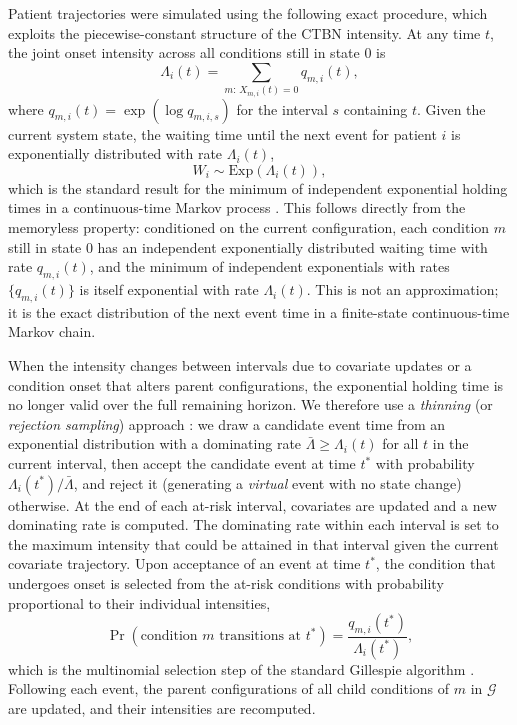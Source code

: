\documentclass[12pt]{article}
\begin{document}
Patient trajectories were simulated using the following exact procedure, which exploits the piecewise-constant structure of the CTBN intensity. At any time $t$, the joint onset intensity across all conditions still in state 0 is
\[
\Lambda_i(t) = \sum_{m:\, X_{m,i}(t) = 0} q_{m,i}(t),
\]
where $q_{m,i}(t) = \exp(\log q_{m,i,s})$ for the interval $s$ containing $t$. Given the current system state, the waiting time until the next event for patient $i$ is exponentially distributed with rate $\Lambda_i(t)$,
\[
W_i \sim \mathrm{Exp}(\Lambda_i(t)),
\]
which is the standard result for the minimum of independent exponential holding times in a continuous-time Markov process \citep{Norris1997}. This follows directly from the memoryless property: conditioned on the current configuration, each condition $m$ still in state 0 has an independent exponentially distributed waiting time with rate $q_{m,i}(t)$, and the minimum of independent exponentials with rates $\{q_{m,i}(t)\}$ is itself exponential with rate $\Lambda_i(t)$. This is not an approximation; it is the exact distribution of the next event time in a finite-state continuous-time Markov chain.

When the intensity changes between intervals due to covariate updates or a condition onset that alters parent configurations, the exponential holding time is no longer valid over the full remaining horizon. We therefore use a \emph{thinning} (or \emph{rejection sampling}) approach \citep{Lewis1979, Ogata1981}: we draw a candidate event time from an exponential distribution with a dominating rate $\bar{\Lambda} \geq \Lambda_i(t)$ for all $t$ in the current interval, then accept the candidate event at time $t^*$ with probability $\Lambda_i(t^*) / \bar{\Lambda}$, and reject it (generating a \emph{virtual} event with no state change) otherwise. At the end of each at-risk interval, covariates are updated and a new dominating rate is computed. The dominating rate within each interval is set to the maximum intensity that could be attained in that interval given the current covariate trajectory. Upon acceptance of an event at time $t^*$, the condition that undergoes onset is selected from the at-risk conditions with probability proportional to their individual intensities,
\[
\Pr(\text{condition } m \text{ transitions at } t^*) = \frac{q_{m,i}(t^*)}{\Lambda_i(t^*)},
\]
which is the multinomial selection step of the standard Gillespie algorithm \citep{Gillespie1977}. Following each event, the parent configurations of all child conditions of $m$ in $\mathcal{G}$ are updated, and their intensities are recomputed.
\end{document}
